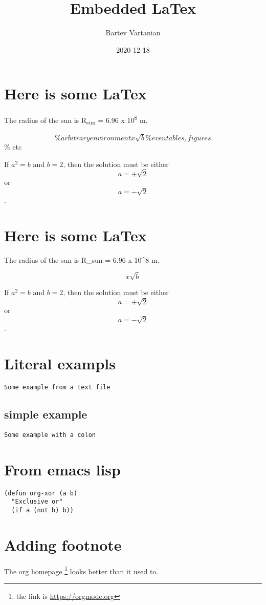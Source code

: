 \documentclass[11pt]{article}
\author{Bartev Vartanian}
\date{2020-12-18}
\title{Embedded LaTex}
\begin{document}
\maketitle
\tableofcontents



\section{Here is some LaTex}
\label{sec:org45ff123}

The radius of the sun is R\textsubscript{sun} = 6.96 x 10\textsuperscript{8} m.

\begin{equation}               \% arbitrary environment
x \sqrt{b}                     \% even tables, figures
\end{equation}                 \% etc

If \(a^2=b\) and \(b = 2\), then the solution must be
either $$ a = +\sqrt{2} $$ or \[ a = -\sqrt{2} \] .

\section{Here is some LaTex}
\label{sec:org0d843fe}


The radius of the sun is R_sun = 6.96 x 10^8 m.

\begin{equation}               %
x \sqrt{b}                     %
\end{equation}                 %

If $a^2=b$ and \( b = 2 \), then the solution must be
either $$ a = +\sqrt{2} $$ or \[ a = -\sqrt{2} \] .


\section{Literal exampls}
\label{sec:org27f5ef4}

\begin{verbatim}
Some example from a text file
\end{verbatim}

\subsection{simple example}
\label{sec:org7f3aea5}
\begin{verbatim}
Some example with a colon
\end{verbatim}

\section{From emacs lisp}
\label{sec:org4ff8cb7}

\begin{verbatim}
(defun org-xor (a b)
  "Exclusive or"
  (if a (not b) b))
\end{verbatim}

\section{Adding footnote}
\label{sec:orgcc2ccf0}

The org homepage \footnote{the link is \url{https://orgmode.org}} looks better than it used to.
\end{document}
